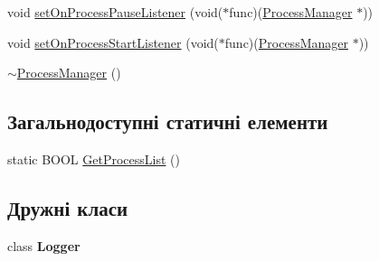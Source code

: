 \begin{DoxyCompactItemize}
\item 
void \hyperlink{class_process_manager_a0c0a42010c6e7949fc6cbebf853cbceb}{set\+On\+Process\+Pause\+Listener} (void($\ast$func)(\hyperlink{class_process_manager}{Process\+Manager} $\ast$))
\item 
void \hyperlink{class_process_manager_a97612a29cefa1f517635e096c1e91691}{set\+On\+Process\+Start\+Listener} (void($\ast$func)(\hyperlink{class_process_manager}{Process\+Manager} $\ast$))
\item 
\hyperlink{class_process_manager_aed3cd2ca11d92395228b758d39030b5f}{$\sim$\+Process\+Manager} ()
\end{DoxyCompactItemize}
\subsection*{Загальнодоступні статичні елементи}
\begin{DoxyCompactItemize}
\item 
static B\+O\+O\+L \hyperlink{class_process_manager_a3d9add158edf3b5112981bf231394c41}{Get\+Process\+List} ()
\end{DoxyCompactItemize}
\subsection*{Дружні класи}
\begin{DoxyCompactItemize}
\item 
\hypertarget{class_process_manager_aff02b76416d2846736b7ecd798921a0a}{class {\bfseries Logger}}\label{class_process_manager_aff02b76416d2846736b7ecd798921a0a}

\end{DoxyCompactItemize}


